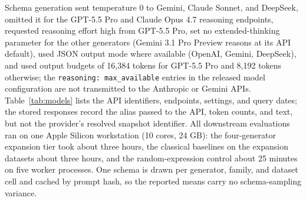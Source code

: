 Schema generation sent temperature 0 to Gemini, Claude Sonnet, and DeepSeek, omitted it for the GPT-5.5 Pro and Claude Opus 4.7 reasoning endpoints, requested reasoning effort high from GPT-5.5 Pro, set no extended-thinking parameter for the other generators (Gemini 3.1 Pro Preview reasons at its API default), used JSON output mode where available (OpenAI, Gemini, DeepSeek), and used output budgets of 16,384 tokens for GPT-5.5 Pro and 8,192 tokens otherwise; the \texttt{reasoning: max\_available} entries in the released model configuration are not transmitted to the Anthropic or Gemini APIs. Table~\ref{tab:models} lists the API identifiers, endpoints, settings, and query dates; the stored responses record the alias passed to the API, token counts, and text, but not the provider's resolved snapshot identifier. All downstream evaluations ran on one Apple Silicon workstation (10 cores, 24 GB): the four-generator expansion tier took about three hours, the classical baselines on the expansion datasets about three hours, and the random-expression control about 25 minutes on five worker processes. One schema is drawn per generator, family, and dataset cell and cached by prompt hash, so the reported means carry no schema-sampling variance.

